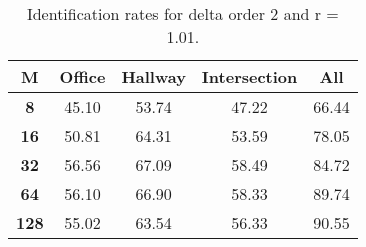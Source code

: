 \begin{table}[h]
    \small
    \centering
    \begin{tabular}{|c|c|c|c|l|}    
    \hline
    {\bf M} & {\bf Office} & {\bf Hallway} & {\bf Intersection} &     \multicolumn{1}{c|}{{\bf All}} \\ \hline
    {\bf 8} & 45.10 & 53.74 & 47.22 & 66.44 \\ \hline
    {\bf 16} & 50.81 & 64.31 & 53.59 & 78.05 \\ \hline
    {\bf 32} & 56.56 & 67.09 & 58.49 & 84.72 \\ \hline
    {\bf 64} & 56.10 & 66.90 & 58.33 & 89.74 \\ \hline
    {\bf 128} & 55.02 & 63.54 & 56.33 & 90.55 \\ \hline
    \end{tabular}
    \caption{Identification rates for delta order 2 and r = 1.01.}    
    \label{tab:identify_speakers_1.01_mit_19_2}
\end{table}
